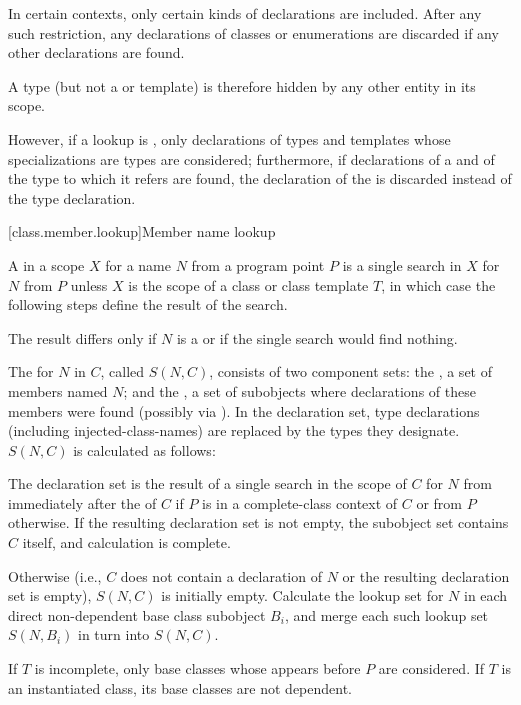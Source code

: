 \pnum
In certain contexts, only certain kinds of declarations are included.
After any such restriction, any declarations of classes or enumerations are discarded if any other declarations are found.
\begin{note}
A type (but not a  or template)
is therefore hidden by any other entity in its scope.
\end{note}
%
However, if a lookup is ,
only declarations of
types and templates whose specializations are types are considered;
furthermore, if declarations
of a  and of the type to which it refers are found,
the declaration of the  is discarded
instead of the type declaration.

[class.member.lookup]{Member name lookup}%
%
%

\pnum
{}%
A  in a scope $X$ for a name $N$ from a program point $P$
is a single search in $X$ for $N$ from $P$
unless $X$ is the scope of a class or class template $T$, in which case the
following steps define the result of the search.
\begin{note}
The result differs only
if $N$ is a  or
if the single search would find nothing.
\end{note}

\pnum
The  for $N$ in $C$, called $S(N,C)$,
consists of two component sets:
the , a set of members named $N$; and
the ,
a set of subobjects where declarations of these members were found
(possibly via ).
In the declaration set, type declarations (including injected-class-names)
are replaced by the types they designate. $S(N,C)$ is calculated as follows:

\pnum
The declaration set is the result of
a single search in the scope of $C$ for $N$
from immediately after the  of $C$
if $P$ is in a complete-class context of $C$ or
from $P$ otherwise.
If the resulting declaration set is not empty, the subobject set
contains $C$ itself, and calculation is complete.

\pnum
Otherwise (i.e., $C$ does not contain a declaration of $N$
or the resulting declaration set is empty), $S(N,C)$ is initially empty.
Calculate the lookup set for $N$
in each direct non-dependent base class subobject $B_i$, and
merge each such lookup set $S(N,B_i)$ in turn into $S(N,C)$.
\begin{note}
If $T$ is incomplete,
only base classes whose  appears before $P$
are considered.
If $T$ is an instantiated class, its base classes are not dependent.
\end{note}

